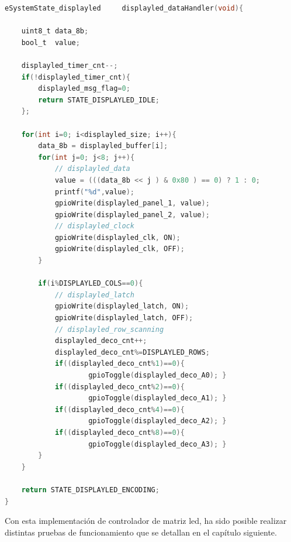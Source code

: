 \begin{lstlisting}[caption=Handler para codificación de datos en cartel de matriz led.,
	language=C, 
	backgroundcolor=\color{mygray},
	caption=	{Código fuente del handler de encoding del display led.},
	captionpos=b]
eSystemState_displayled     displayled_dataHandler(void){

    uint8_t data_8b;
    bool_t  value;

    displayled_timer_cnt--;
    if(!displayled_timer_cnt){
        displayled_msg_flag=0;
        return STATE_DISPLAYLED_IDLE;
    };    

    for(int i=0; i<displayled_size; i++){
        data_8b = displayled_buffer[i];
        for(int j=0; j<8; j++){
            // displayled_data 
            value = (((data_8b << j ) & 0x80 ) == 0) ? 1 : 0;
            printf("%d",value);
            gpioWrite(displayled_panel_1, value);
            gpioWrite(displayled_panel_2, value);
            // displayled_clock 
            gpioWrite(displayled_clk, ON);
            gpioWrite(displayled_clk, OFF);
        }
        
        if(i%DISPLAYLED_COLS==0){
            // displayled_latch 
            gpioWrite(displayled_latch, ON);
            gpioWrite(displayled_latch, OFF);
            // displayled_row_scanning
            displayled_deco_cnt++;
            displayled_deco_cnt%=DISPLAYLED_ROWS;
            if((displayled_deco_cnt%1)==0){ 
            		gpioToggle(displayled_deco_A0); }
            if((displayled_deco_cnt%2)==0){ 
            		gpioToggle(displayled_deco_A1); }
            if((displayled_deco_cnt%4)==0){ 
            		gpioToggle(displayled_deco_A2); }
            if((displayled_deco_cnt%8)==0){ 
            		gpioToggle(displayled_deco_A3); }
        }
    }
    
    return STATE_DISPLAYLED_ENCODING;
}

\end{lstlisting}

Con esta implementación de controlador de matriz led, ha sido posible realizar distintas pruebas de funcionamiento que se detallan en el capítulo siguiente.\\
